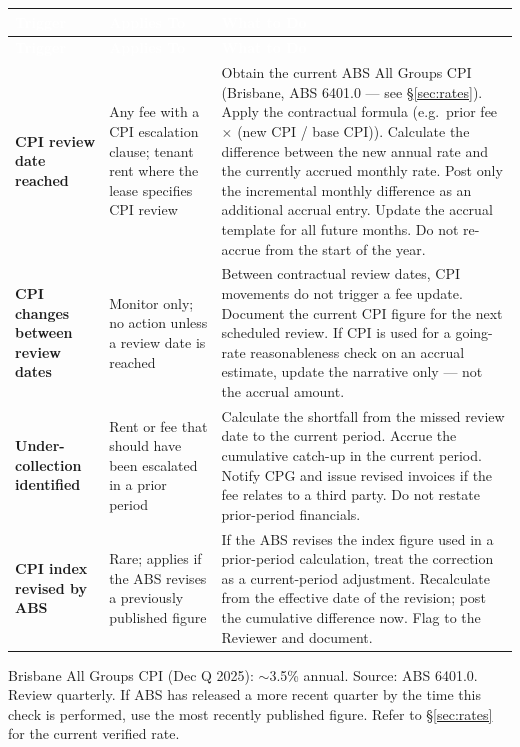 \documentclass[10pt,a4paper]{article}
\begin{document}
{\small\sffamily
\begin{longtable}{@{} L{3.0cm} L{2.5cm} L{7.2cm} @{}}
\textcolor{white}{\bfseries Trigger} & \textcolor{white}{\bfseries Applies To} & \textcolor{white}{\bfseries What to Do} \\
\midrule
\endfirsthead
{}\textcolor{white}{\bfseries Trigger} & \textcolor{white}{\bfseries Applies To} & \textcolor{white}{\bfseries What to Do} \\
\midrule
\endhead
\textbf{CPI review date reached} & Any fee with a CPI escalation clause; tenant rent where the lease specifies CPI review & Obtain the current ABS All Groups CPI (Brisbane, ABS 6401.0 --- see \S\ref{sec:rates}). Apply the contractual formula (e.g.\ prior fee $\times$ (new CPI / base CPI)). Calculate the difference between the new annual rate and the currently accrued monthly rate. Post only the incremental monthly difference as an additional accrual entry. Update the accrual template for all future months. Do not re-accrue from the start of the year. \\
\textbf{CPI changes between review dates} & Monitor only; no action unless a review date is reached & Between contractual review dates, CPI movements do not trigger a fee update. Document the current CPI figure for the next scheduled review. If CPI is used for a going-rate reasonableness check on an accrual estimate, update the narrative only --- not the accrual amount. \\
\textbf{Under-collection identified} & Rent or fee that should have been escalated in a prior period & Calculate the shortfall from the missed review date to the current period. Accrue the cumulative catch-up in the current period. Notify CPG and issue revised invoices if the fee relates to a third party. Do not restate prior-period financials. \\
\textbf{CPI index revised by ABS} & Rare; applies if the ABS revises a previously published figure & If the ABS revises the index figure used in a prior-period calculation, treat the correction as a current-period adjustment. Recalculate from the effective date of the revision; post the cumulative difference now. Flag to the Reviewer and document. \\
\bottomrule
\end{longtable}}

\begin{note}
Brisbane All Groups CPI (Dec Q 2025): $\sim$3.5\% annual. Source: ABS 6401.0. Review quarterly. If ABS has released a more recent quarter by the time this check is performed, use the most recently published figure. Refer to \S\ref{sec:rates} for the current verified rate.
\end{note}
\end{document}
